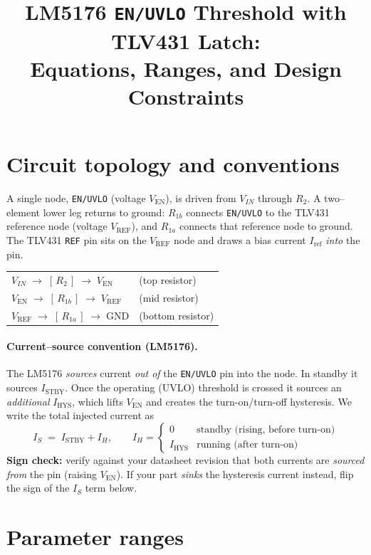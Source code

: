 \documentclass[11pt]{article}
\title{LM5176 \texttt{EN/UVLO} Threshold with TLV431 Latch:\\ Equations, Ranges, and Design Constraints}
\author{}
\date{}
\newcommand{\Ven}{V_{\mathrm{EN}}}
\newcommand{\Vref}{V_{\mathrm{REF}}}
\newcommand{\Iref}{I_{\mathrm{ref}}}
\newcommand{\Istby}{I_{\mathrm{STBY}}}
\newcommand{\Ihys}{I_{\mathrm{HYS}}}
\newcommand{\IH}{I_{H}}
\newcommand{\Rone}{R_{1a}}
\newcommand{\Rtwo}{R_{1b}}
\newcommand{\Rt}{R_{2}}
\begin{document}
\maketitle

\section{Circuit topology and conventions}

A single node, \texttt{EN/UVLO} (voltage $\Ven$), is driven from $V_{IN}$ through
$\Rt$. A two--element lower leg returns to ground: $\Rtwo$ connects \texttt{EN/UVLO}
to the TLV431 reference node (voltage $\Vref$), and $\Rone$ connects that reference
node to ground. The TLV431 \texttt{REF} pin sits on the $\Vref$ node and draws a bias
current $\Iref$ \emph{into} the pin.

\begin{center}
\begin{tabular}{ll}
$V_{IN}\;\longrightarrow\;[\,\Rt\,]\;\longrightarrow\;\Ven$ &  (top resistor) \\
$\Ven\;\longrightarrow\;[\,\Rtwo\,]\;\longrightarrow\;\Vref$ & (mid resistor) \\
$\Vref\;\longrightarrow\;[\,\Rone\,]\;\longrightarrow\;\mathrm{GND}$ & (bottom resistor) \\
\end{tabular}
\end{center}

\paragraph{Current--source convention (LM5176).}
The LM5176 \emph{sources} current \emph{out of} the \texttt{EN/UVLO} pin into the node.
In standby it sources $\Istby$. Once the operating (UVLO) threshold is crossed it
sources an \emph{additional} $\Ihys$, which lifts $\Ven$ and creates the turn-on/turn-off
hysteresis. We write the total injected current as
\[
I_S \;=\; \Istby + \IH,\qquad
\IH=\begin{cases}0 & \text{standby (rising, before turn-on)}\\[2pt]\Ihys & \text{running (after turn-on)}\end{cases}
\]
\textbf{Sign check:} verify against your datasheet revision that both currents are
\emph{sourced from} the pin (raising $\Ven$). If your part \emph{sinks} the hysteresis
current instead, flip the sign of the $I_S$ term below.

\section{Parameter ranges}
\end{document}
